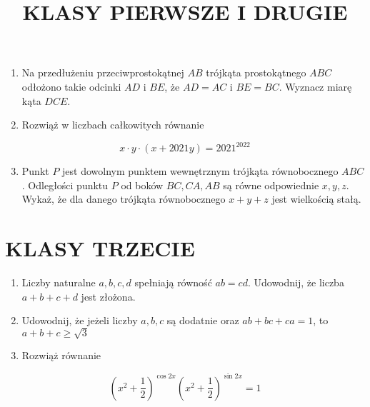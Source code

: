\documentclass[10pt]{article}
\title{KLASY PIERWSZE I DRUGIE }
\author{}
\date{}
\begin{document}
\maketitle
\begin{enumerate}
  \item Na przedłużeniu przeciwprostokątnej \(A B\) trójkąta prostokątnego \(A B C\) odłożono takie odcinki \(A D\) i \(B E\), że \(A D=A C\) i \(B E=B C\). Wyznacz miarę kąta \(D C E\).
  \item Rozwiąż w liczbach całkowitych równanie
\end{enumerate}

\[
x \cdot y \cdot(x+2021 y)=2021^{2022}
\]

\begin{enumerate}
  \setcounter{enumi}{2}
  \item Punkt \(P\) jest dowolnym punktem wewnętrznym trójkąta równobocznego \(A B C\). Odległości punktu \(P\) od boków \(B C, C A, A B\) są równe odpowiednie \(x, y, z\). Wykaż, że dla danego trójkąta równobocznego \(x+y+z\) jest wielkością stałą.
\end{enumerate}

\section*{KLASY TRZECIE}
\begin{enumerate}
  \item Liczby naturalne \(a, b, c, d\) spełniają równość \(a b=c d\). Udowodnij, że liczba \(a+b+c+d\) jest złożona.
  \item Udowodnij, że jeżeli liczby \(a, b, c\) są dodatnie oraz \(a b+b c+c a=1\), to \(a+b+c \geq \sqrt{3}\)
  \item Rozwiąż równanie
\end{enumerate}

\[
\left(x^{2}+\frac{1}{2}\right)^{\cos 2 x}\left(x^{2}+\frac{1}{2}\right)^{\sin 2 x}=1
\]
\end{document}

